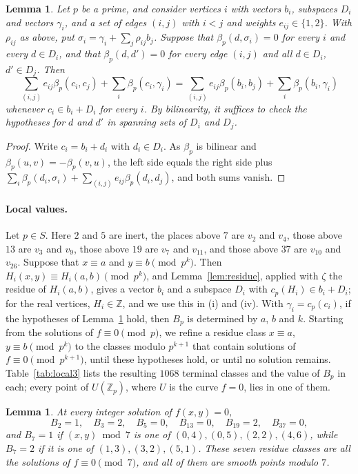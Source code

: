\documentclass[11pt]{article}
\newtheorem{lemma}[theorem]{Lemma}
\newcommand{\Z}{\mathbb{Z}}
\begin{document}
\begin{lemma}\label{lem:envelope}
Let $p$ be a prime, and consider vertices $i$ with vectors $b_i$, subspaces $D_i$ and vectors $\gamma_i$, and a set of edges $(i,j)$ with $i<j$ and weights $e_{ij}\in\{1,2\}$. With $\rho_{ij}$ as above, put $\sigma_i=\gamma_i+\sum_j\rho_{ij}b_j$. Suppose that $\beta_p(d,\sigma_i)=0$ for every $i$ and every $d\in D_i$, and that $\beta_p(d,d')=0$ for every edge $(i,j)$ and all $d\in D_i$, $d'\in D_j$. Then
\[
\sum_{(i,j)}e_{ij}\beta_p(c_i,c_j)+\sum_i\beta_p(c_i,\gamma_i)=\sum_{(i,j)}e_{ij}\beta_p(b_i,b_j)+\sum_i\beta_p(b_i,\gamma_i)
\]
whenever $c_i\in b_i+D_i$ for every $i$. By bilinearity, it suffices to check the hypotheses for $d$ and $d'$ in spanning sets of $D_i$ and $D_j$.
\end{lemma}

\begin{proof}
Write $c_i=b_i+d_i$ with $d_i\in D_i$. As $\beta_p$ is bilinear and $\beta_p(u,v)=-\beta_p(v,u)$, the left side equals the right side plus $\sum_i\beta_p(d_i,\sigma_i)+\sum_{(i,j)}e_{ij}\beta_p(d_i,d_j)$, and both sums vanish.
\end{proof}

\paragraph{Local values.} Let $p\in S$. Here $2$ and $5$ are inert, the places above $7$ are $v_2$ and $v_4$, those above $13$ are $v_3$ and $v_9$, those above $19$ are $v_7$ and $v_{11}$, and those above $37$ are $v_{10}$ and $v_{26}$. Suppose that $x\equiv a$ and $y\equiv b\pmod{p^k}$. Then $H_i(x,y)\equiv H_i(a,b)\pmod{p^k}$, and Lemma~\ref{lem:residue}, applied with $\zeta$ the residue of $H_i(a,b)$, gives a vector $b_i$ and a subspace $D_i$ with $c_p(H_i)\in b_i+D_i$; for the real vertices, $H_i\in\Z$, and we use this in (i) and (iv). With $\gamma_i=c_p(c_i)$, if the hypotheses of Lemma~\ref{lem:envelope} hold, then $B_p$ is determined by $a$, $b$ and $k$. Starting from the solutions of $f\equiv0\pmod p$, we refine a residue class $x\equiv a$, $y\equiv b\pmod{p^k}$ to the classes modulo $p^{k+1}$ that contain solutions of $f\equiv0\pmod{p^{k+1}}$, until these hypotheses hold, or until no solution remains. Table~\ref{tab:local3} lists the resulting $1068$ terminal classes and the value of $B_p$ in each; every point of $U(\Z_p)$, where $U$ is the curve $f=0$, lies in one of them.

\begin{lemma}\label{lem:local3}
At every integer solution of $f(x,y)=0$,
\[
B_2=1,\quad B_3=2,\quad B_5=0,\quad B_{13}=0,\quad B_{19}=2,\quad B_{37}=0,
\]
and $B_7=1$ if $(x,y)\bmod7$ is one of $(0,4),(0,5),(2,2),(4,6)$, while $B_7=2$ if it is one of $(1,3),(3,2),(5,1)$. These seven residue classes are all the solutions of $f\equiv0\pmod7$, and all of them are smooth points modulo $7$.
\end{lemma}
\end{document}
